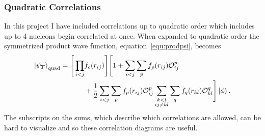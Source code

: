\subsubsection{Quadratic Correlations}
In this project I have included correlations up to quadratic order which includes up to 4 nucleons begin correlated at once. When expanded to quadratic order the symmetrized product wave function, equation~\ref{equ:prodpsi}, becomes
\begin{equation}
   \begin{split}
      \left| \psi_T \right>_\text{quad} = \Bigg[\prod\limits_{i<j}&f_c(r_{ij})\Bigg] \Bigg[1+\sum\limits_{i<j}\sum\limits_p f_p(r_{ij})\mathcal{O}_{ij}^p \\
         & + \frac{1}{2}\sum\limits_{i<j}\sum\limits_p f_p(r_{ij})\mathcal{O}_{ij}^p\sum_{\substack{k<l\\ij \ne kl}}\sum\limits_q f_q(r_{kl})\mathcal{O}_{kl}^q \Bigg] \left| \phi \right>.
   \end{split}
   \label{equ:fullquadcorr}
\end{equation}
The subscripts on the sums, which describe which correlations are allowed, can be hard to visualize and so these correlation diagrams are useful.
